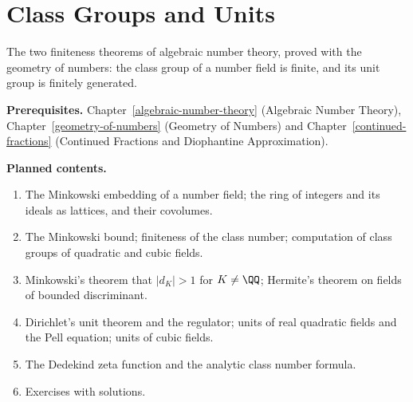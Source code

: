 \chapter{Class Groups and Units}\label{class-groups-and-units}

The two finiteness theorems of algebraic number theory, proved with the geometry of numbers: the class group of a number field is finite, and its unit group is finitely generated.

\noindent\textbf{Prerequisites.} Chapter~\ref{algebraic-number-theory} (Algebraic Number Theory), Chapter~\ref{geometry-of-numbers} (Geometry of Numbers) and Chapter~\ref{continued-fractions} (Continued Fractions and Diophantine Approximation).

\noindent\textbf{Planned contents.}
\begin{enumerate}
\item The Minkowski embedding of a number field; the ring of integers and its ideals as lattices, and their covolumes.
\item The Minkowski bound; finiteness of the class number; computation of class groups of quadratic and cubic fields.
\item Minkowski's theorem that $|d_K| > 1$ for $K \neq \QQ$; Hermite's theorem on fields of bounded discriminant.
\item Dirichlet's unit theorem and the regulator; units of real quadratic fields and the Pell equation; units of cubic fields.
\item The Dedekind zeta function and the analytic class number formula.
\item Exercises with solutions.
\end{enumerate}
